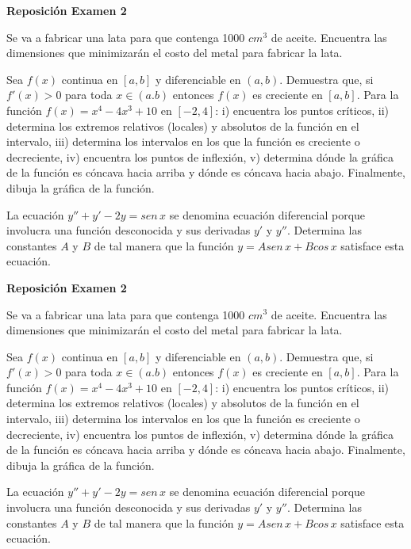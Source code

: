 \documentclass[12pt]{exam}
\begin{document}
\newpage

\begin{center}
\Large 
\textbf{Reposición Examen 2}
\end{center}{}
\normalsize

\begin{questions}
    \question Se va a fabricar una lata para que contenga 1000 $cm^3$ de aceite. Encuentra las dimensiones que minimizarán el costo del metal para fabricar la lata. 

\vskip10pt
\question 
Sea $f(x)$ continua en $[a,b]$ y diferenciable en $(a,b)$. Demuestra que, si $f'(x)>0$ para toda $x\in (a.b)$ entonces $f(x)$ es creciente en $[a,b]$.
\vskip10pt
\question Para la función $f(x)=x^4-4x^3+10$ en $[-2,4]$: i) encuentra los puntos críticos, ii) determina los extremos relativos (locales) y absolutos de la función en el intervalo, iii) determina los intervalos en los que la función es creciente o decreciente, iv) encuentra los puntos de inflexión, v) determina dónde la gráfica de la función es cóncava hacia arriba y dónde es cóncava hacia abajo. Finalmente, dibuja la gráfica de la función.

\question La ecuación $y''+y'-2y=sen\,x$ se denomina ecuación diferencial porque involucra una función desconocida y sus derivadas $y'$ y $y''$. Determina las constantes $A$ y $B$ de tal manera que la función $y=Asen\,x+Bcos\,x$ satisface esta ecuación.

    \end{questions}

\vskip30pt

\begin{center}
\Large 
\textbf{Reposición Examen 2}
\end{center}{}
\normalsize

\begin{questions}
    \question Se va a fabricar una lata para que contenga 1000 $cm^3$ de aceite. Encuentra las dimensiones que minimizarán el costo del metal para fabricar la lata. 

\vskip10pt
\question 
Sea $f(x)$ continua en $[a,b]$ y diferenciable en $(a,b)$. Demuestra que, si $f'(x)>0$ para toda $x\in (a.b)$ entonces $f(x)$ es creciente en $[a,b]$.
\vskip10pt
\question Para la función $f(x)=x^4-4x^3+10$ en $[-2,4]$: i) encuentra los puntos críticos, ii) determina los extremos relativos (locales) y absolutos de la función en el intervalo, iii) determina los intervalos en los que la función es creciente o decreciente, iv) encuentra los puntos de inflexión, v) determina dónde la gráfica de la función es cóncava hacia arriba y dónde es cóncava hacia abajo. Finalmente, dibuja la gráfica de la función.

\question La ecuación $y''+y'-2y=sen\,x$ se denomina ecuación diferencial porque involucra una función desconocida y sus derivadas $y'$ y $y''$. Determina las constantes $A$ y $B$ de tal manera que la función $y=Asen\,x+Bcos\,x$ satisface esta ecuación.

    \end{questions}
\end{document}
